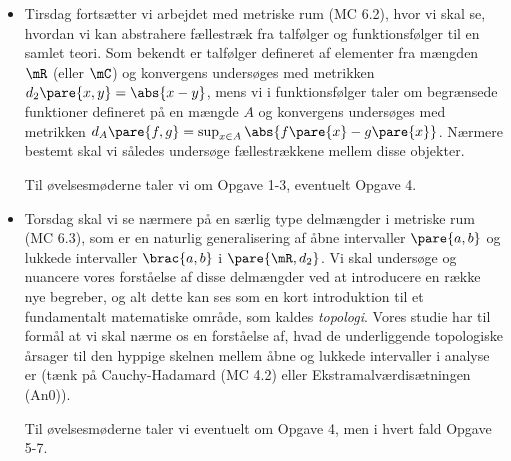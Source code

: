 \begin{itemize}
    \item Tirsdag fortsætter vi arbejdet med metriske rum (MC 6.2), hvor vi skal se, hvordan vi kan abstrahere fællestræk fra talfølger og funktionsfølger til en samlet teori. Som bekendt er talfølger defineret af elementer fra mængden $\mR$ (eller $\mC$) og konvergens undersøges med metrikken $d_2\pare{x,y} = \abs{x-y}$, mens vi i funktionsfølger taler om begrænsede funktioner defineret på en mængde $A$ og konvergens undersøges med metrikken $d_A\pare{f,g} = \sup_{x\in A}\abs{f\pare{x}-g\pare{x}}$. Nærmere bestemt skal vi således undersøge fællestrækkene mellem disse objekter.
    
    Til øvelsesmøderne taler vi om Opgave 1-3, eventuelt Opgave 4.
    
    \item Torsdag skal vi se nærmere på en særlig type delmængder i metriske rum (MC 6.3), som er en naturlig generalisering af åbne intervaller $\pare{a,b}$ og lukkede intervaller $\brac{a,b}$ i $\pare{\mR,d_2}$. Vi skal undersøge og nuancere vores forståelse af disse delmængder ved at introducere en række nye begreber, og alt dette kan ses som en kort introduktion til et fundamentalt matematiske område, som kaldes \textit{topologi}. Vores studie har til formål at vi skal nærme os en forståelse af, hvad de underliggende topologiske årsager til den hyppige skelnen mellem åbne og lukkede intervaller i analyse er (tænk på Cauchy-Hadamard (MC 4.2) eller Ekstramalværdisætningen (An0)). 
    
    Til øvelsesmøderne taler vi eventuelt om Opgave 4, men i hvert fald Opgave 5-7.
\end{itemize}

